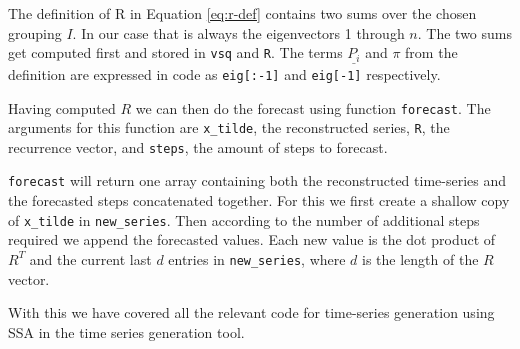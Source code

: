 The definition of R in Equation \eqref{eq:r-def} contains two sums over the chosen grouping $I$. In our case that is always the eigenvectors 1 through $n$. The two sums get computed first and stored in \texttt{vsq} and \texttt{R}. The terms $\underline{P_i}$ and $\pi$ from the definition are expressed in code as \texttt{eig[:-1]} and \texttt{eig[-1]} respectively. 

Having computed $R$ we can then do the forecast using function \texttt{forecast}. The arguments for this function are \texttt{x\_tilde}, the reconstructed series, \texttt{R}, the recurrence vector, and \texttt{steps}, the amount of steps to forecast. 


\texttt{forecast} will return one array containing both the reconstructed time-series and the forecasted steps concatenated together. For this we first create a shallow copy of \texttt{x\_tilde} in \texttt{new\_series}. Then according to the number of additional steps required we append the forecasted values. Each new value is the dot product of $R^T$ and the current last $d$ entries in \texttt{new\_series}, where $d$ is the length of the $R$ vector. 

With this we have covered all the relevant code for time-series generation using SSA in the time series generation tool. 